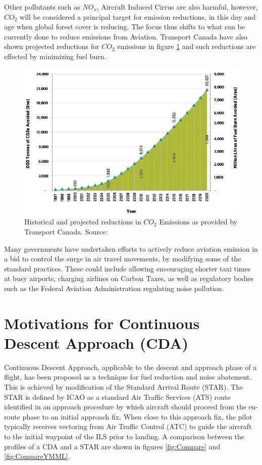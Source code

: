 \documentclass{aer1315-pretty}
\begin{document}
Other pollutants such as $NO_x$, Aircraft Induced Cirrus are also harmful, however, $CO_2$ will be considered a principal target for emission reductions, in this day and age when global forest cover is reducing. The focus thus shifts to what can be currently done to reduce emissions from Aviation. Transport Canada have also shown projected reductions for $CO_2$ emissions in figure \ref{fig:CO2} and such reductions are effected by minimizing fuel burn.\par

\begin{figure}
\centering
\includegraphics[height=0.4\textwidth]{figures/reduce_gas_emissions.jpg}%
	\caption{Historical and projected reductions in $CO_2$ Emissions as provided by Transport Canada. Source:  \cite{TransportCanada}}	
	\label{fig:CO2}
\end{figure}

Many governments have undertaken efforts to actively reduce aviation emission in a bid to control the surge in air travel movements, by modifying some of the standard practices. These could include allowing encouraging shorter taxi times at busy airports, charging airlines on Carbon Taxes, as well as regulatory bodies such as the Federal Aviation Administration regulating noise pollution.\par 
 

\section{Motivations for Continuous Descent Approach (CDA)}
\label{sec:CDA}
Continuous Descent Approach, applicable to the descent and approach phase of a flight, has been proposed as a technique for fuel reduction and noise abatement. This is achieved by modification of the Standard Arrival Route (STAR). The STAR is defined by ICAO as a standard Air Traffic Services (ATS) route identified in an approach procedure by which aircraft should proceed from the en-route phase to an initial approach fix. When close to this approach fix, the pilot typically receives vectoring from Air Traffic Control (ATC) to guide the aircraft to the initial waypoint of the ILS prior to landing. A comparison between the profiles of a CDA and a STAR are shown in figures \ref{fig:Compare} and \ref{fig:CompareYMML}. \par
\end{document}
